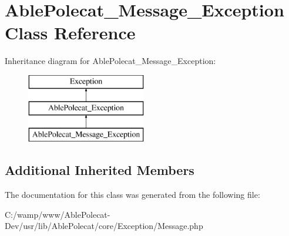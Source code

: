 \hypertarget{class_able_polecat___message___exception}{}\section{Able\+Polecat\+\_\+\+Message\+\_\+\+Exception Class Reference}
\label{class_able_polecat___message___exception}
Inheritance diagram for Able\+Polecat\+\_\+\+Message\+\_\+\+Exception\+:\begin{figure}[H]
\begin{center}
\leavevmode
\includegraphics[height=3.000000cm]{class_able_polecat___message___exception}
\end{center}
\end{figure}
\subsection*{Additional Inherited Members}


The documentation for this class was generated from the following file\+:\begin{DoxyCompactItemize}
\item 
C\+:/wamp/www/\+Able\+Polecat-\/\+Dev/usr/lib/\+Able\+Polecat/core/\+Exception/Message.\+php\end{DoxyCompactItemize}
